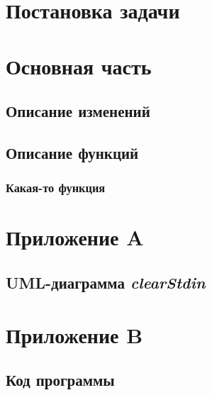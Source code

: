 \documentclass[a4paper, 12pt]{article}
\begin{document}
\cleardoublepage
\section*{Постановка задачи}
\cleardoublepage



\section*{Основная часть}

\subsection{Описание изменений}

\subsection{Описание функций}
\subsubsection{Какая-то функция}

\cleardoublepage


\section*{Приложение A}
\renewcommand\thesection{\Alph{section}}
\renewcommand\thesubsection{\thesection.\arabic{subsection}}
\setcounter{subsection}{0}

\subsection{UML-диаграмма \textit{clearStdin}}


\cleardoublepage

\setcounter{subsection}{0}
\section*{Приложение B}
\renewcommand\thesection{\Alph{section}}
\renewcommand\thesubsection{B.\arabic{subsection}}

\subsection{Код программы}

\fontsize{9}{9}\selectfont
\begin{verbatim}

\end{verbatim}
\end{document}
